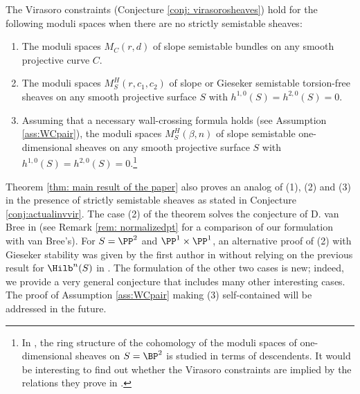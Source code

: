 \begin{thm}[=Theorem \ref{thm: main result of the paper}]
\notready\label{thm: main}
The Virasoro constraints (Conjecture \ref{conj: virasorosheaves}) hold for the following moduli spaces when there are no strictly semistable sheaves:
\begin{enumerate}
\item The moduli spaces $M_C(r,d)$ of slope semistable bundles on any smooth projective curve $C$.
\item The moduli spaces $M_S^H(r,c_1, c_2)$ of slope or Gieseker semistable torsion-free sheaves on any smooth projective surface $S$ with $h^{1,0}(S)=h^{2,0}(S)=0$.
\item  Assuming that a necessary wall-crossing formula holds (see Assumption \ref{ass:WCpair}), the moduli spaces $M_S^H(\beta, n)$ of slope semistable one-dimensional sheaves on any smooth projective surface $S$ with $h^{1,0}(S)=h^{2,0}(S)=0$.\footnote{In \cite{Pi22}, the ring structure of the cohomology of the moduli spaces of one-dimensional sheaves
on $S = \BP^2$ is studied in terms of descendents. It would be interesting to find out whether the
Virasoro constraints are implied by the relations they prove in \cite[Proposition 2.6]{Pi22}.}
\end{enumerate}

\end{thm}

Theorem \ref{thm: main result of the paper} also proves an analog of (1), (2) and (3) in the presence of strictly semistable sheaves as stated in Conjecture \ref{conj:actualinvvir}. The case (2) of the theorem solves the conjecture of D. van Bree in \cite{bree} (see Remark \ref{rem: normalizedpt} for a comparison of our formulation with van Bree's). For $S=\PP^2$ and $\PP^1\times\PP^1$, an alternative proof of (2) with Gieseker stability was given by the first author in \cite{BoVir} without relying on the previous result for $\Hilb^n(S)$ in \cite{moop}. The formulation of the other two cases is new; indeed, we provide a very general conjecture that includes many other interesting cases. The proof of Assumption \ref{ass:WCpair} making (3) self-contained will be addressed in the future.






